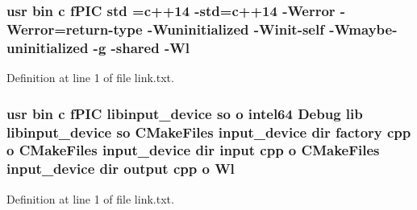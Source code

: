 \subsubsection[{\texorpdfstring{std}{std}}]{\setlength{\rightskip}{0pt plus 5cm}usr bin {\bf c} f\+P\+IC std ={\bf c}++14 -\/std={\bf c}++14 -\/Werror -\/Werror=return-\/type -\/Wuninitialized -\/Winit-\/self -\/Wmaybe-\/uninitialized -\/g -\/shared -\/{\bf Wl}}\hypertarget{common_2io__devices_2CMakeFiles_2input__device_8dir_2link_8txt_a5f87c8f8e33670f7c8c5221b6be1bcc4}{}\label{common_2io__devices_2CMakeFiles_2input__device_8dir_2link_8txt_a5f87c8f8e33670f7c8c5221b6be1bcc4}


Definition at line 1 of file link.\+txt.

\subsubsection[{\texorpdfstring{Wl}{Wl}}]{\setlength{\rightskip}{0pt plus 5cm}usr bin {\bf c} f\+P\+IC libinput\+\_\+device {\bf so} o intel64 Debug lib libinput\+\_\+device {\bf so} C\+Make\+Files input\+\_\+device dir factory cpp o C\+Make\+Files input\+\_\+device dir input cpp o C\+Make\+Files input\+\_\+device dir output cpp o Wl}\hypertarget{common_2io__devices_2CMakeFiles_2input__device_8dir_2link_8txt_aad5ca2fe3b86a2487e5c97a706e2704e}{}\label{common_2io__devices_2CMakeFiles_2input__device_8dir_2link_8txt_aad5ca2fe3b86a2487e5c97a706e2704e}


Definition at line 1 of file link.\+txt.

